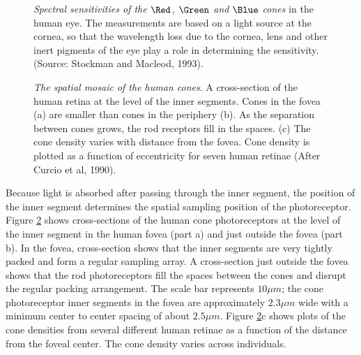 \begin{figure}
\centerline{
}
\caption[Cone Spectral Sensitivities]{
{\em Spectral sensitivities of the $\Red$, $\Green$ and $\Blue$ cones}
in the human eye.
The measurements are based on a light source
at the cornea, so that the wavelength loss due to the
cornea, lens and other inert pigments of the eye
play a role in determining the sensitivity.
(Source:  Stockman and Macleod, 1993).
}
\label{f2:rec.spec.sens}
\end{figure}

\begin{figure}
\centerline{
}
\caption[Photoreceptor Sampling]{
{\em The spatial mosaic of the human cones}.
A cross-section of the
human retina at the level of the inner segments.
Cones in the fovea (a)
are smaller than cones in the periphery (b).
As the separation between cones grows,
the rod receptors fill in the spaces.
(c)  The cone density varies with distance from
the fovea.
Cone density is plotted as a function of eccentricity
for seven human retinae (After Curcio et al, 1990).
}
%
\label{f2:retinal.samples}
\end{figure}
\nocite{Curcio1990,Curcio1992}
Because light is absorbed 
after passing through the inner segment,
the position of the inner segment
determines the spatial sampling position of the photoreceptor.
Figure \ref{f2:retinal.samples} shows cross-sections
of the human cone photoreceptors at the level of the inner segment
in the human fovea (part a) and just outside the fovea (part b).
In the fovea, cross-section shows
that the inner segments are very tightly packed
and form a regular sampling array.
A cross-section just outside the fovea
shows that the rod photoreceptors fill
the spaces between the cones
and disrupt the regular packing arrangement.
The scale bar represents $10 \mu m$;
the cone photoreceptor inner segments in the
fovea are approximately $2.3 \mu m$ wide
with a minimum center to center spacing of about $2.5 \mu m$.
Figure \ref{f2:retinal.samples}c shows plots of the
cone densities from several different human retinae
as a function of the distance from the foveal center.
The cone density varies across individuals.

